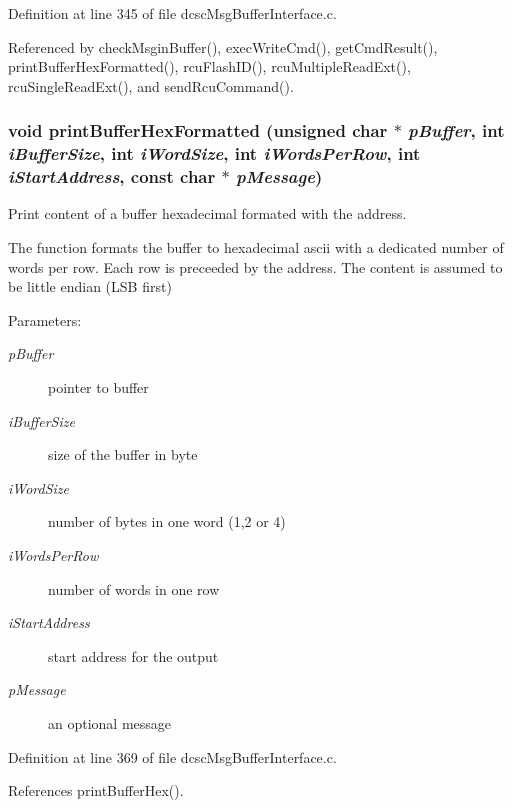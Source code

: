 Definition at line 345 of file dcsc\-Msg\-Buffer\-Interface.c.

Referenced by check\-Msgin\-Buffer(), exec\-Write\-Cmd(), get\-Cmd\-Result(), print\-Buffer\-Hex\-Formatted(), rcu\-Flash\-ID(), rcu\-Multiple\-Read\-Ext(), rcu\-Single\-Read\-Ext(), and send\-Rcu\-Command().\hypertarget{group__dcsc__msg__buffer__access_gc44ca908f157f8de95b81638e298e08e}{
\subsubsection[printBufferHexFormatted]{\setlength{\rightskip}{0pt plus 5cm}void print\-Buffer\-Hex\-Formatted (unsigned char $\ast$ {\em p\-Buffer}, int {\em i\-Buffer\-Size}, int {\em i\-Word\-Size}, int {\em i\-Words\-Per\-Row}, int {\em i\-Start\-Address}, const char $\ast$ {\em p\-Message})}}
\label{group__dcsc__msg__buffer__access_gc44ca908f157f8de95b81638e298e08e}


Print content of a buffer hexadecimal formated with the address. 

The function formats the buffer to hexadecimal ascii with a dedicated number of words per row. Each row is preceeded by the address. The content is assumed to be little endian (LSB first) \begin{Desc}
\item[Parameters:]
\begin{description}
\item[{\em p\-Buffer}]pointer to buffer \item[{\em i\-Buffer\-Size}]size of the buffer in byte \item[{\em i\-Word\-Size}]number of bytes in one word (1,2 or 4) \item[{\em i\-Words\-Per\-Row}]number of words in one row \item[{\em i\-Start\-Address}]start address for the output \item[{\em p\-Message}]an optional message \end{description}
\end{Desc}


Definition at line 369 of file dcsc\-Msg\-Buffer\-Interface.c.

References print\-Buffer\-Hex().

